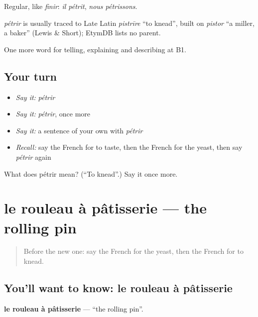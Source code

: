 Regular, like \emph{finir}: \emph{il pétrit}, \emph{nous pétrissons}.

\begin{cousinweb}
\emph{pétrir} is usually traced to Late Latin \emph{pistrīre} \textquotedblleft{}to knead\textquotedblright{}, built on \emph{pistor} \textquotedblleft{}a miller, a baker\textquotedblright{} (Lewis \& Short); EtymDB lists no parent.
\end{cousinweb}

\begin{grammarlens}[title={What you've built}]
One more word for telling, explaining and describing at B1.
\end{grammarlens}

\subsection*{Your turn}
\begin{itemize}
\raggedright
  \item \emph{Say it:} \emph{pétrir}
  \item \emph{Say it:} \emph{pétrir}, once more
  \item \emph{Say it:} a sentence of your own with \emph{pétrir}
  \item \emph{Recall:} say the French for to taste, then the French for the yeast, then say \emph{pétrir} again
\end{itemize}

\begin{tcolorbox}[breakable,colback=teal!4,colframe=teal!35!black,title={Before you move on}]
What does pétrir mean? (\textquotedblleft{}To knead\textquotedblright{}.) Say it once more.
\end{tcolorbox}
\section[le rouleau à pâtisserie]{le rouleau à pâtisserie — the rolling pin}

\label{lesson:FR-C333-rouleau-a-patisserie}



\begin{quote}
Before the new one: say the French for the yeast, then the French for to knead.
\end{quote}

\subsection*{You'll want to know: le rouleau à pâtisserie}
\textbf{le rouleau à pâtisserie} — \textquotedblleft{}the rolling pin\textquotedblright{}.

